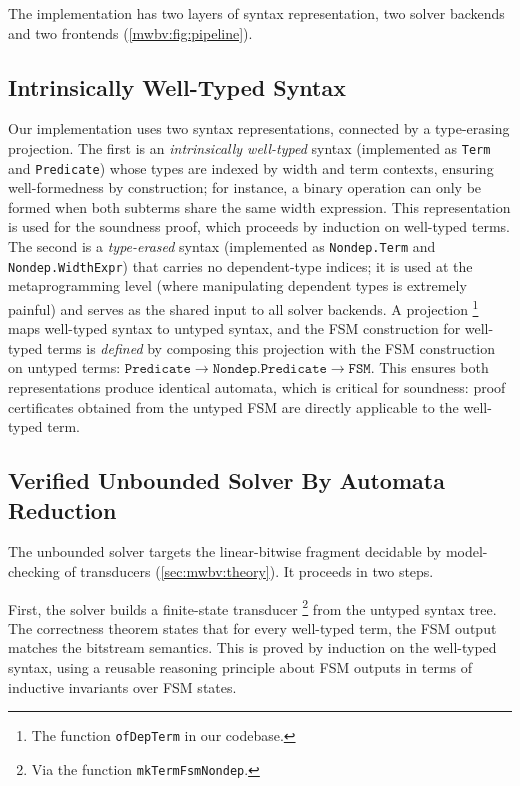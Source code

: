 The implementation has two layers of syntax representation,
two solver backends and two frontends (\cref{mwbv:fig:pipeline}).

\subsection{Intrinsically Well-Typed Syntax}

Our implementation uses two syntax representations, connected by a type-erasing projection.
The first is an \emph{intrinsically well-typed} syntax (implemented as
\texttt{Term} and \texttt{Predicate})
whose types are indexed by width and term contexts,
ensuring well-formedness by construction;
for instance, a binary operation can only be formed
when both subterms share the same width expression.
This representation is used for the soundness proof,
which proceeds by induction on well-typed terms.
The second is a \emph{type-erased} syntax
(implemented as \texttt{Nondep.Term} and \texttt{Nondep.WidthExpr})
that carries no dependent-type indices;
it is used at the metaprogramming level
(where manipulating dependent types is extremely painful)
and serves as the shared input to all solver backends.
A projection%
\footnote{The function \texttt{ofDepTerm} in our codebase.}
maps well-typed syntax to untyped syntax,
and the FSM construction for well-typed terms is \emph{defined}
by composing this projection with the FSM construction on untyped terms:
$\texttt{Predicate} \rightarrow \texttt{Nondep.Predicate} \rightarrow
\texttt{FSM}$. This ensures both representations produce identical automata,
which is critical for soundness: proof certificates obtained from the untyped
FSM are directly applicable to the well-typed term.

\subsection{Verified Unbounded Solver By Automata Reduction}

The unbounded solver targets the linear-bitwise fragment decidable by
model-checking of transducers (\cref{sec:mwbv:theory}). It proceeds in
two steps.

First, the solver builds a finite-state transducer%
\footnote{Via the function \texttt{mkTermFsmNondep}.}
from the untyped syntax tree.
The correctness theorem states that for every well-typed term,
the FSM output matches the bitstream semantics.
This is proved by induction on the well-typed syntax,
using a reusable reasoning principle about FSM outputs
in terms of inductive invariants over FSM states.

